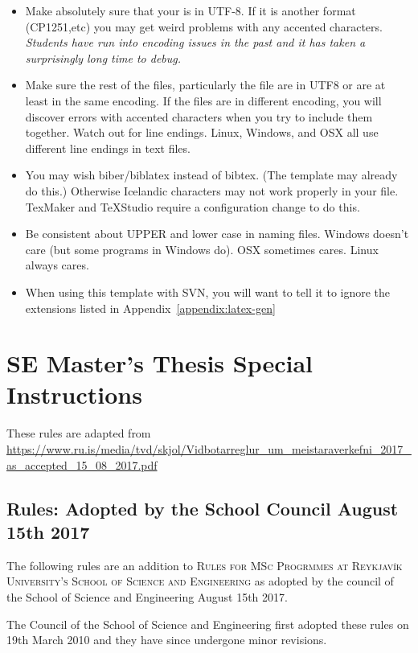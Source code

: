 \begin{itemize}
\item Make absolutely sure that your  is in UTF-8.  If it is another format (CP1251,etc) you may get weird problems with any accented characters.
  {\em Students have run into encoding issues in the past and it has taken a surprisingly long time to debug.}

\item Make sure the rest of the files, particularly the  file are in UTF8 or are at least in the same encoding.
  If the files are in different encoding, you will discover errors with accented characters when you try to include them together.
  Watch out for line endings. Linux, Windows, and OSX all use different line endings in text files.

\item You may wish biber/biblatex instead of bibtex.
(The template may already do this.)
Otherwise Icelandic characters may not work properly in your  file.
TexMaker and TeXStudio require a configuration change to do this.

\item Be consistent about UPPER and lower case in naming files.
  Windows doesn't care (but some programs in Windows do).
  OSX sometimes cares.
  Linux always cares.
\item When using this template with SVN, you will want to tell it to ignore the extensions listed in Appendix~\ref{appendix:latex-gen}
\end{itemize}

\section{SE Master's Thesis Special Instructions}
These rules are adapted from \url{https://www.ru.is/media/tvd/skjol/Vidbotarreglur_um_meistaraverkefni_2017_as_accepted_15_08_2017.pdf}
\subsection{Rules: Adopted by the School Council August 15th 2017}
The following rules are an addition to \textsc{Rules for MSc Progrmmes at Reykjavík University's School of Science and Engineering}
as adopted by the council of the School of Science and Engineering August 15th 2017.

The Council of the School of Science and Engineering first adopted these rules on 19th March 2010 and they have since undergone minor revisions.

